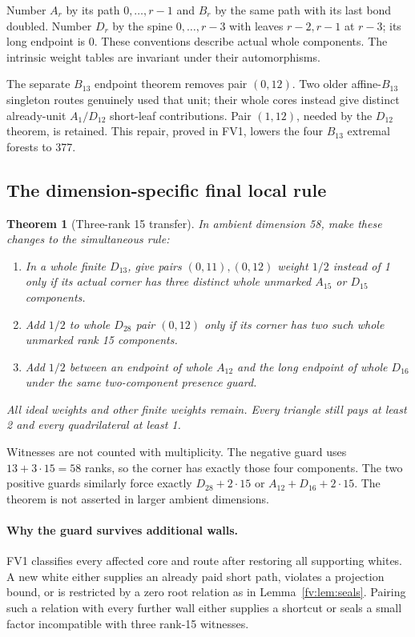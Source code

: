 \documentclass[11pt]{article}
\newtheorem{theorem}{Theorem}[section]
\theoremstyle{remark}\newtheorem{remark}[theorem]{Remark}
\numberwithin{equation}{section}
\begin{document}
Number $A_r$ by its path $0,\ldots,r-1$ and $B_r$ by the same
path with its last bond doubled. Number $D_r$ by the spine
$0,\ldots,r-3$ with leaves $r-2,r-1$ at $r-3$; its long endpoint
is $0$. These conventions describe actual whole components. The
intrinsic weight tables are invariant under their automorphisms.

The separate $B_{13}$ endpoint theorem removes pair $(0,12)$.
Two older affine-$B_{13}$ singleton routes genuinely used that
unit; their whole cores instead give distinct already-unit
$A_1/D_{12}$ short-leaf contributions. Pair $(1,12)$, needed
by the $D_{12}$ theorem, is retained. This repair, proved in FV1,
lowers the four $B_{13}$ extremal forests to 377.

\subsection{The dimension-specific final local rule}
\begin{theorem}[Three-rank 15 transfer]\label{fv:thm:local}
In ambient dimension 58, make these changes to the simultaneous rule:
\begin{enumerate}
\item In a whole finite $D_{13}$, give pairs $(0,11),(0,12)$ weight $1/2$
instead of 1 only if its actual corner has three distinct whole unmarked
 $A_{15}$ or $D_{15}$ components.
\item Add $1/2$ to whole $D_{28}$ pair $(0,12)$ only if its corner has two
such whole unmarked rank 15 components.
\item Add $1/2$ between an endpoint of whole $A_{12}$ and the long endpoint
of whole $D_{16}$ under the same two-component presence guard.
\end{enumerate}
All ideal weights and other finite weights remain. Every triangle still
pays at least 2 and every quadrilateral at least 1.
\end{theorem}
Witnesses are not counted with multiplicity. The negative guard uses
 $13+3\cdot15=58$ ranks, so the corner has exactly those four components.
The two positive guards similarly force exactly $D_{28}+2\cdot15$ or
 $A_{12}+D_{16}+2\cdot15$. The theorem is not asserted in larger ambient
dimensions.

\paragraph{Why the guard survives additional walls.}
FV1 classifies every affected core and route after restoring all
supporting whites. A new white either supplies an already paid
short path, violates a projection bound, or is restricted by a
zero root relation as in Lemma~\ref{fv:lem:seals}. Pairing such
a relation with every further wall either supplies a shortcut
or seals a small factor incompatible with three rank-15 witnesses.
\end{document}
